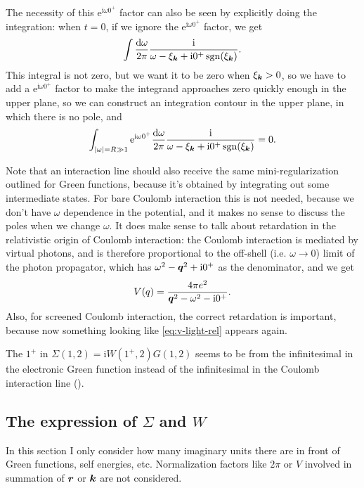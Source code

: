 \documentclass[hyperref, a4paper, 12pt]{report}
\DeclareMathOperator{\sgn}{sgn}
\newcommand*{\ii}{\mathrm{i}}
\newcommand*{\ee}{\mathrm{e}}
\begin{document}
The necessity of this $\ee^{\ii \omega 0^+}$ factor 
can also be seen by explicitly doing the integration:
when $t = 0$, if we ignore the $\ee^{\ii \omega 0^+}$ factor, 
we get 
\[
    \int \frac{\dd{\omega}}{2\pi} \frac{\ii}{ \omega - \xi_{\vb*{k}} + \ii 0^+ \sgn(\xi_{\vb*{k}})}.
\]
This integral is not zero, but we want it to be zero when $\xi_{\vb*{k}} > 0$,
so we have to add a $\ee^{\ii \omega 0^+}$ factor
to make the integrand approaches zero quickly enough in the upper plane,
so we can construct an integration contour in the upper plane,
in which there is no pole, 
and 
\[
    \int_{\abs{\omega} = R \gg 1} \ee^{\ii \omega 0^+} \frac{\dd{\omega}}{2\pi} 
    \frac{\ii}{ \omega - \xi_{\vb*{k}} + \ii 0^+ \sgn(\xi_{\vb*{k}})} = 0.
\]

Note that an interaction line should also receive the same mini-regularization 
outlined for Green functions, 
because it's obtained by integrating out some intermediate states. 
For bare Coulomb interaction this is not needed,
because we don't have $\omega$ dependence in the potential,
and it makes no sense to discuss the poles when we change $\omega$.
It does make sense to talk about retardation 
in the relativistic origin of Coulomb interaction:
the Coulomb interaction is mediated by virtual photons,
and is therefore proportional to the off-shell (i.e. $\omega \to 0$) limit of 
the photon propagator, 
which has $\omega^2 - \vb*{q}^2 + \ii 0^+$ 
as the denominator, and we get 
\begin{equation}
    V(q) = \frac{4\pi e^2}{\vb*{q}^2 - \omega^2 - \ii 0^+}.
    \label{eq:v-light-rel}
\end{equation}
Also, for screened Coulomb interaction, 
the correct retardation is important,
because now something looking like \eqref{eq:v-light-rel} appears again.

The $1^+$ in $\Sigma(1, 2) = \ii W(1^+, 2) G(1, 2)$ 
seems to be from the infinitesimal in the electronic Green function 
instead of the infinitesimal in the Coulomb interaction line
().

\subsection{The expression of $\Sigma$ and $W$}\label{sec:gw-bse.preliminaries.diagram.corrections}

In this section I only consider how many imaginary units there are in front of 
Green functions, self energies, etc.
Normalization factors like $2\pi$ or $V$ 
involved in summation of $\vb*{r}$ or $\vb*{k}$ are not considered.
\end{document}
